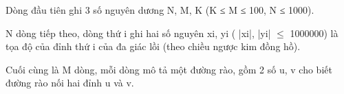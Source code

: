 Dòng đầu tiên ghi 3 số nguyên dương N, M, K (K ≤ M ≤ 100, N ≤ 1000).   


   N dòng tiếp theo, dòng thứ i ghi hai số nguyên xi, yi ( |xi|, |yi|  $\le$  1000000) là tọa độ của đỉnh thứ i của đa giác lồi (theo chiều ngược kim đồng hồ).   


   Cuối cùng là M dòng, mỗi dòng mô tả một đường rào, gồm 2 số u, v cho biết đường rào nối hai đỉnh u và v.